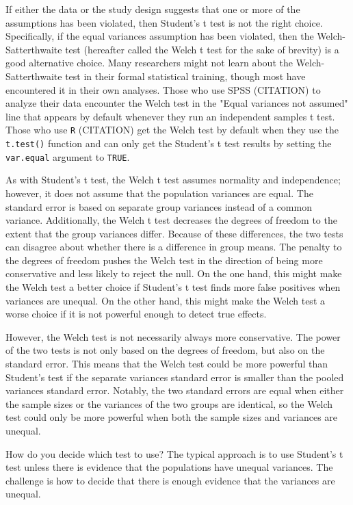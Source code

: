 \documentclass[man,a4paper,noextraspace]{apa6}\usepackage[]{graphicx}\usepackage[]{color}
\begin{document}
    If either the data or the study design suggests that one or more of the assumptions has been violated, then Student's t test is not the right choice. Specifically, if the equal variances assumption has been violated, then the Welch-Satterthwaite test (hereafter called the Welch t test for the sake of brevity) is a good alternative choice. Many researchers might not learn about the Welch-Satterthwaite test in their formal statistical training, though most have encountered it in their own analyses. Those who use SPSS (CITATION) to analyze their data encounter the Welch test in the "Equal variances not assumed" line that appears by default whenever they run an independent samples t test. Those who use \texttt{R} (CITATION) get the Welch test by default when they use the \texttt{t.test()} function and can only get the Student's t test results by setting the \texttt{var.equal} argument to \texttt{TRUE}.
    
        As with Student's t test, the Welch t test assumes normality and independence; however, it does not assume that the population variances are equal. The standard error is based on separate group variances instead of a common variance. Additionally, the Welch t test decreases the degrees of freedom to the extent that the group variances differ. Because of these differences, the two tests can disagree about whether there is a difference in group means. The penalty to the degrees of freedom pushes the Welch test in the direction of being more conservative and less likely to reject the null. On the one hand, this might make the Welch test a better choice if Student's t test finds more false positives when variances are unequal. On the other hand, this might make the Welch test a worse choice if it is not powerful enough to detect true effects. 
        
    However, the Welch test is not necessarily always more conservative. The power of the two tests is not only based on the degrees of freedom, but also on the standard error. This means that the Welch test could be more powerful than Student's test if the separate variances standard error is smaller than the pooled variances standard error. Notably, the two standard errors are equal when either the sample sizes or the variances of the two groups are identical, so the Welch test could only be more powerful when both the sample sizes and variances are unequal.  
    
    How do you decide which test to use? The typical approach is to use Student's t test unless there is evidence that the populations have unequal variances. The challenge is how to decide that there is enough evidence that the variances are unequal. 
\end{document}
